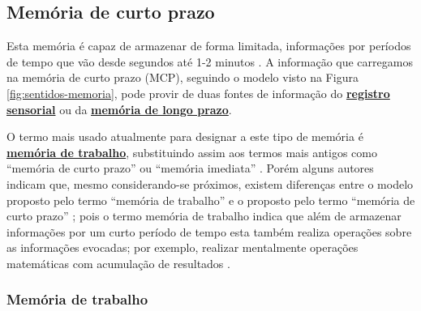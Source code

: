 \subsection{Memória de curto prazo } 
\label{sec:memoria:curto}



Esta memória é capaz de armazenar de forma limitada, 
informações por períodos de tempo que vão desde segundos até 1-2 minutos
\cite[pp. 678]{spreen2006compendium} \cite[pp. 158]{sternbergpsicologia}.
A informação que carregamos na memória de curto prazo (MCP),
seguindo o modelo visto na Figura \ref{fig:sentidos-memoria},  
pode provir de duas fontes de informação do \hyperref[fig:sentidos-memoria]{\textbf{registro sensorial}} 
ou da \hyperref[sec:memoria:longo]{\textbf{memória de longo prazo}}.


O termo mais usado atualmente para designar a este tipo de memória é 
\hyperref[subsubsec:memoriatrabalho]{\textbf{memória de trabalho}},
substituindo assim aos termos mais antigos como ``memória de curto prazo'' ou ``memória imediata''
\cite[pp. 678]{spreen2006compendium}.
Porém alguns autores indicam  que, mesmo considerando-se próximos, 
existem diferenças entre o modelo proposto pelo termo 
``memória de trabalho'' e o proposto pelo termo ``memória de curto prazo'' 
\cite[pp. 266, 267, 269]{braisby2012cognitive};
pois o termo memória de trabalho indica que além de armazenar informações por um curto período de tempo
esta também realiza operações sobre as informações evocadas; 
por exemplo, realizar mentalmente operações matemáticas com acumulação de resultados 
\cite[pp. 267, 272]{braisby2012cognitive}.


\subsubsection{Memória de trabalho} 
\label{subsubsec:memoriatrabalho}

